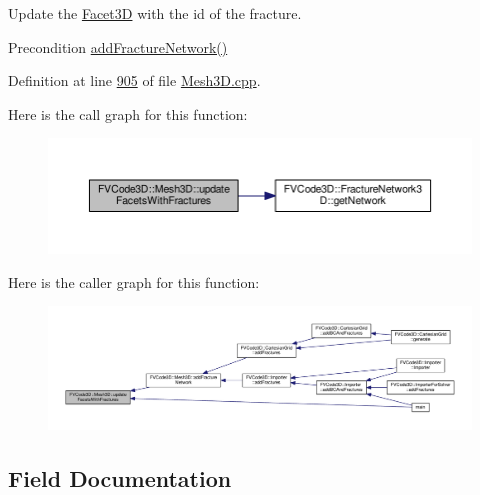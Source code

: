 Update the \hyperlink{classFVCode3D_1_1Mesh3D_1_1Facet3D}{Facet3D} with the id of the fracture. 

\begin{DoxyPrecond}{Precondition}
\hyperlink{classFVCode3D_1_1Mesh3D_a269c01796091da2f599e66b6b91b39dd}{add\+Fracture\+Network()} 
\end{DoxyPrecond}


Definition at line \hyperlink{Mesh3D_8cpp_source_l00905}{905} of file \hyperlink{Mesh3D_8cpp_source}{Mesh3\+D.\+cpp}.



Here is the call graph for this function\+:
\nopagebreak
\begin{figure}[H]
\begin{center}
\leavevmode
\includegraphics[width=350pt]{classFVCode3D_1_1Mesh3D_a164529f402302f3f74235ad91c8bea07_cgraph}
\end{center}
\end{figure}




Here is the caller graph for this function\+:
\nopagebreak
\begin{figure}[H]
\begin{center}
\leavevmode
\includegraphics[width=350pt]{classFVCode3D_1_1Mesh3D_a164529f402302f3f74235ad91c8bea07_icgraph}
\end{center}
\end{figure}




\subsection{Field Documentation}
